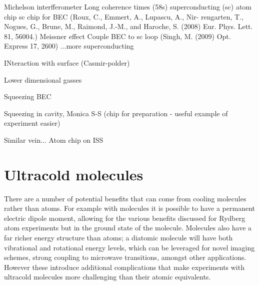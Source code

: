 Michelson interfferometer \cite{Wang2005}
Long coherence times (58s) \cite{Deutsch2010}
superconducting (sc) atom chip \cite{Nirrengarten2006}
sc chip for BEC
(Roux, C., Emmert, A., Lupascu, A., Nir- rengarten, T., Nogues, G., Brune, M.,
Raimond, J.-M., and Haroche, S. (2008) Eur. Phys. Lett. 81, 56004.)
Meissner effect \cite{Cano2008}
Couple BEC to sc loop (Singh, M. (2009) Opt. Express 17, 2600)
...more superconducting \cite{Bernon2013}

INteraction with surface (Casmir-polder)
\cite{PhysRevA.72.033610}
\cite{PhysRevLett.98.063201}


Lower dimensional gasses
\cite{PhysRevLett.116.030402}
\cite{Hofferberth2007}
\cite{Yuen2015}

Squeezing BEC
\cite{PhysRevLett.105.080403}

Squeezing in cavity, Monica S-S (chip for preparation - useful example of experiment
easier) \cite{PhysRevLett.104.073604}

Similar vein...  Atom chip on ISS \cite{Frye2021}

\section{Ultracold molecules}

There are a number of potential benefits that can come from cooling molecules
rather than atoms. For example with molecules it is possible to have a
permanent electric dipole moment, allowing for the various benefits discussed
for Rydberg atom experiments but in the ground state of the molecule.
%
%
Molecules also have a far richer energy structure than atoms; a diatomic
molecule will have both vibrational and rotational energy levels, which can be
leveraged for novel imaging schemes, strong coupling to microwave transitions,
amongst other applications. However these introduce additional complications
that make experiments with ultracold molecules more challenging than their
atomic equivalents.

